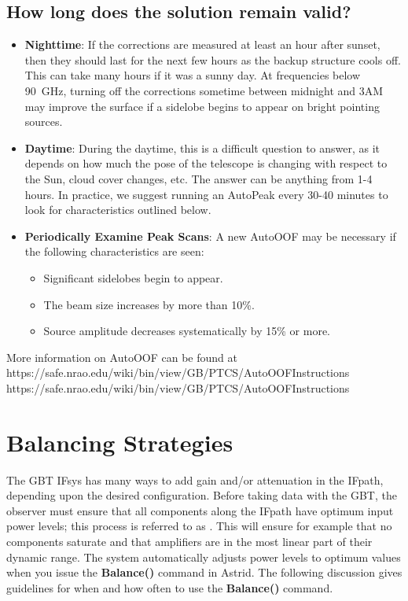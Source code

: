 \subsection{How long does the solution remain valid?}
\begin{itemize}

\item {\bf Nighttime}: If the corrections are measured at least an hour after sunset,
then they should last for the next few hours as the backup structure cools off.
This can take many hours if it was a sunny day.  At frequencies below 90~GHz, turning
off the corrections sometime between midnight and 3AM may improve the surface if a
sidelobe begins to appear on bright pointing sources.

\item {\bf Daytime}: During the daytime, this is a difficult question to answer, as it
depends on how much the pose of the telescope is changing with respect to the Sun,
cloud cover changes, etc. The answer can be anything from 1-4 hours. In practice, we
suggest running an AutoPeak every 30-40 minutes to look for characteristics outlined below.

\item {\bf Periodically Examine Peak Scans}: A new AutoOOF may be necessary if the
following characteristics are seen:
\begin{itemize}
\item Significant sidelobes begin to appear.
\item The beam size increases by more than 10\%.
\item Source amplitude decreases systematically by 15\% or more.
\end{itemize}
\end{itemize}

\noindent More information on AutoOOF can be found at\\ \htmladdnormallink
{https://safe.nrao.edu/wiki/bin/view/GB/PTCS/AutoOOFInstructions}
{https://safe.nrao.edu/wiki/bin/view/GB/PTCS/AutoOOFInstructions}


\newpage
\section{Balancing Strategies}\label{sec:balancestrategy}

The \gls{GBT} \gls{IFsys} has many ways to add gain and/or attenuation
in the \gls{IFpath}, depending upon the desired configuration. Before taking
data with the \gls{GBT}, the observer must ensure that all components along
the \gls{IFpath} have optimum input power levels; this process is referred to
as . This will ensure for example that no components saturate
and that amplifiers are in the most linear part of their dynamic range.
The system automatically adjusts power levels to optimum values when you 
issue the {\bfseries{\textcolor{pythonKeywords}{Balance}}()} command in
\gls{Astrid}. The following discussion gives guidelines for when and how often to
use the {\bfseries{\textcolor{pythonKeywords}{Balance}}()} command.

